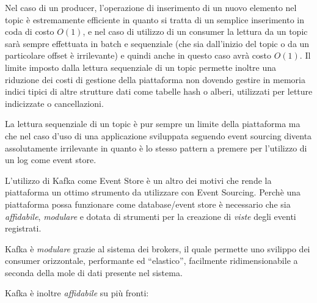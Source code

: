 \documentclass[]{article}
\begin{document}
Nel caso di un producer, l'operazione di inserimento di un nuovo
elemento nel topic è estremamente efficiente in quanto si tratta di un
semplice inserimento in coda di costo \(O(1)\), e nel caso di utilizzo
di un consumer la lettura da un topic sarà sempre effettuata in batch e
sequenziale (che sia dall'inizio del topic o da un particolare offset è
irrilevante) e quindi anche in questo caso avrà costo \(O(1)\). Il
limite imposto dalla lettura sequenziale di un topic permette inoltre
una riduzione dei costi di gestione della piattaforma non dovendo
gestire in memoria indici tipici di altre strutture dati come tabelle
hash o alberi, utilizzati per letture indicizzate o cancellazioni.

La lettura sequenziale di un topic è pur sempre un limite della
piattaforma ma che nel caso d'uso di una applicazione sviluppata
seguendo event sourcing diventa assolutamente irrilevante in quanto è lo
stesso pattern a premere per l'utilizzo di un log come event store.

L'utilizzo di Kafka come Event Store è un altro dei motivi che rende la
piattaforma un ottimo strumento da utilizzare con Event Sourcing. Perchè
una piattaforma possa funzionare come database/event store è necessario
che sia \emph{affidabile}, \emph{modulare} e dotata di strumenti per la
creazione di \emph{viste} degli eventi registrati.

Kafka è \emph{modulare} grazie al sistema dei brokers, il quale permette
uno svilippo dei consumer orizzontale, performante ed ``elastico'',
facilmente ridimensionabile a seconda della mole di dati presente nel
sistema.

Kafka è inoltre \emph{affidabile} su più fronti:
\end{document}
